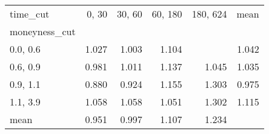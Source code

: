\begin{tabular}{lrrrrr}
\toprule
time\_cut &  0, 30 &  30, 60 &  60, 180 &  180, 624 &  mean \\
moneyness\_cut &          &           &            &             &       \\
\midrule
0.0, 0.6    &    1.027 &     1.003 &      1.104 &             & 1.042 \\
0.6, 0.9    &    0.981 &     1.011 &      1.137 &       1.045 & 1.035 \\
0.9, 1.1    &    0.880 &     0.924 &      1.155 &       1.303 & 0.975 \\
1.1, 3.9    &    1.058 &     1.058 &      1.051 &       1.302 & 1.115 \\
mean          &    0.951 &     0.997 &      1.107 &       1.234 &       \\
\bottomrule
\end{tabular}
